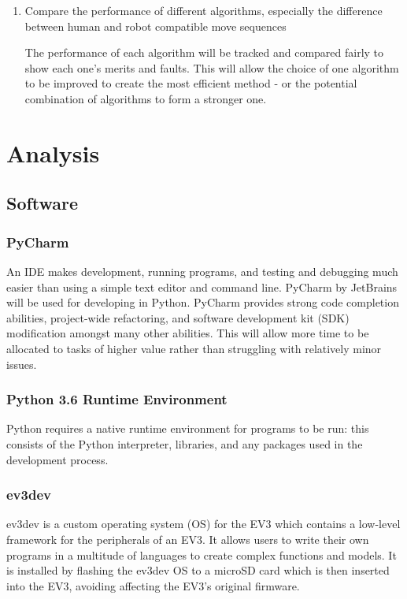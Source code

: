 \documentclass{report}
\begin{document}
\begin{enumerate}
    	\item Compare the performance of different algorithms, especially the difference between human and robot compatible move sequences \par The performance of each algorithm will be tracked and compared fairly to show each one's merits and faults. This will allow the choice of one algorithm to be improved to create the most efficient method - or the potential combination of algorithms to form a stronger one.
    \end{enumerate}
    
    \section{Analysis}
    \subsection{Software}
    
    \subsubsection{PyCharm}
    An IDE makes development, running programs, and testing and debugging much easier than using a simple text editor and command line. PyCharm by JetBrains \cite{JetBrains} will be used for developing in Python. PyCharm provides strong code completion abilities, project-wide refactoring, and software development kit (SDK) modification amongst many other abilities. This will allow more time to be allocated to tasks of higher value rather than struggling with relatively minor issues.
    
	\subsubsection{Python 3.6 Runtime Environment}
    Python requires a native runtime environment for programs to be run: this consists of the Python interpreter, libraries, and any packages used in the development process.
    
    \subsubsection{ev3dev}
    ev3dev \cite{Ev3dev.org} is a custom operating system (OS) for the EV3 which contains a low-level framework for the peripherals of an EV3. It allows users to write their own programs in a multitude of languages to create complex functions and models. It is installed by flashing the ev3dev OS to a microSD card which is then inserted into the EV3, avoiding affecting the EV3's original firmware.
    
\end{document}
